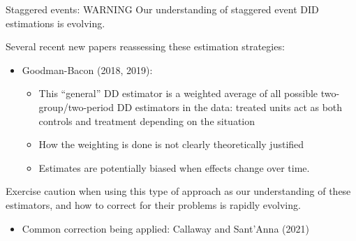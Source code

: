 \documentclass[
  ignorenonframetext,
]{beamer}
\providecommand{\tightlist}{%
  \setlength{\itemsep}{0pt}\setlength{\parskip}{0pt}}
\begin{document}
\begin{frame}{Staggered events: WARNING}
\protect\hypertarget{staggered-events-warning}{}
Our understanding of staggered event DID estimations is evolving.

Several recent new papers reassessing these estimation strategies:

\begin{itemize}
\tightlist
\item
  Goodman-Bacon (2018, 2019):

  \begin{itemize}
  \item
    This ``general'' DD estimator is a weighted average of all possible
    two-group/two-period DD estimators in the data: treated units act as
    both controls and treatment depending on the situation
  \item
    How the weighting is done is not clearly theoretically justified
  \item
    Estimates are potentially biased when effects change over time.
  \end{itemize}
\end{itemize}

Exercise caution when using this type of approach as our understanding
of these estimators, and how to correct for their problems is rapidly
evolving.

\begin{itemize}
\tightlist
\item
  Common correction being applied: Callaway and Sant'Anna (2021)
\end{itemize}
\end{frame}
\end{document}
